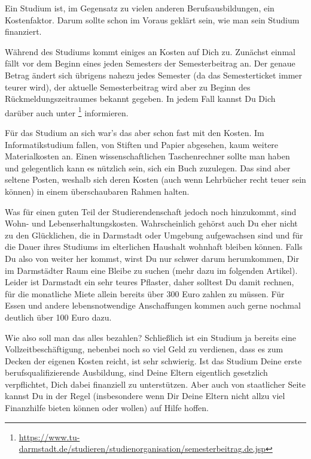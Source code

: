 {Ein Studium ist, im Gegensatz zu vielen anderen Berufsausbildungen, ein Kostenfaktor. Darum sollte schon im Voraus geklärt sein, wie man sein Studium finanziert.
}
{Während des Studiums kommt einiges an Kosten auf Dich zu. Zunächst einmal fällt vor dem Beginn eines jeden Semesters der Semesterbeitrag an. Der genaue Betrag ändert sich übrigens nahezu jedes Semester (da das Semesterticket immer teurer wird), der aktuelle Semesterbeitrag wird aber zu Beginn des Rückmeldungszeitraumes bekannt gegeben. In jedem Fall kannst Du Dich darüber auch unter \footnote{\url{https://www.tu-darmstadt.de/studieren/studienorganisation/semesterbeitrag.de.jsp}} informieren.

Für das Studium an sich war's das aber schon fast mit den Kosten. Im Informatikstudium fallen, von Stiften und Papier abgesehen, kaum weitere Materialkosten an. Einen wissenschaftlichen Taschenrechner sollte man haben und gelegentlich kann es nützlich sein, sich ein Buch zuzulegen. Das sind aber seltene Posten, weshalb sich deren Kosten (auch wenn Lehrbücher recht teuer sein können) in einem überschaubaren Rahmen halten. 

Was für einen guten Teil der Studierendenschaft jedoch noch hinzukommt, sind Wohn- und Lebenserhaltungskosten. Wahrscheinlich gehörst auch Du eher nicht zu den Glücklichen, die in Darmstadt oder Umgebung aufgewachsen sind und für die Dauer ihres Studiums im elterlichen Haushalt wohnhaft bleiben können. Falls Du also von weiter her kommst, wirst Du nur schwer darum herumkommen, Dir im Darmstädter Raum eine Bleibe zu suchen (mehr dazu im folgenden Artikel). Leider ist Darmstadt ein sehr teures Pflaster, daher solltest Du damit rechnen, für die monatliche Miete allein bereits über 300 Euro zahlen zu müssen. Für Essen und andere lebensnotwendige Anschaffungen kommen auch gerne nochmal deutlich über 100 Euro dazu.

Wie also soll man das alles bezahlen? Schließlich ist ein Studium ja bereits eine Vollzeitbeschäftigung, nebenbei noch so viel Geld zu verdienen, dass es zum Decken der eigenen Kosten reicht, ist sehr schwierig. Ist das Studium Deine erste berufsqualifizierende Ausbildung, sind Deine Eltern eigentlich gesetzlich verpflichtet, Dich dabei finanziell zu unterstützen. Aber auch von staatlicher Seite kannst Du in der Regel (insbesondere wenn Dir Deine Eltern nicht allzu viel Finanzhilfe bieten können oder wollen) auf Hilfe hoffen.

}
